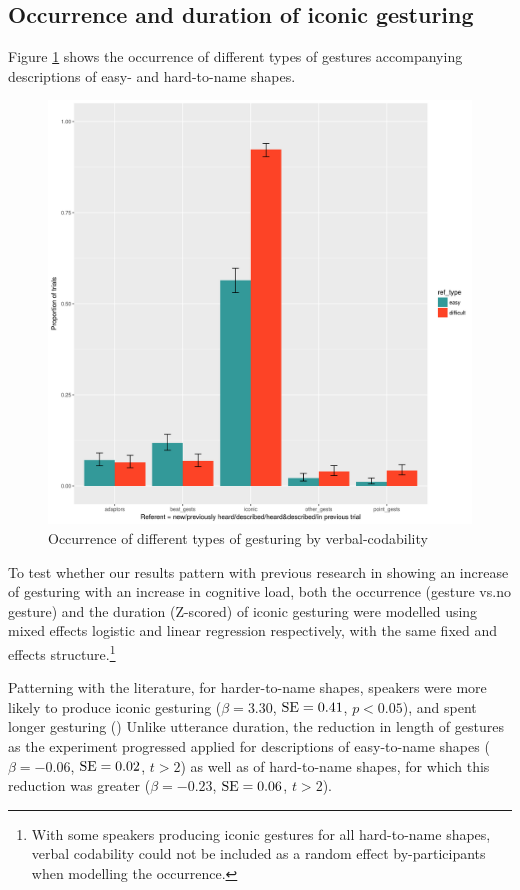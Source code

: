 \documentclass[a4paper,man,natbib]{apa6}
\newcommand{\resultsLog}[3]{$\beta = #1$, $\textnormal{SE} = #2$, $p #3$}
\newcommand{\resultsLM}[3]{$\beta = #1$, $\textnormal{SE} = #2$, $t #3$}
\begin{document}
\subsection{Occurrence and duration of iconic gesturing}
Figure \ref{fig:gtypes} shows the occurrence of different types of gestures accompanying descriptions of easy- and hard-to-name shapes.
\begin{figure}
  \centering
	\includegraphics[width=\linewidth]{e5_gest_occurrence.png}
  \caption{Occurrence of different types of gesturing by verbal-codability}
  \label{fig:gtypes}
\end{figure}
To test whether our results pattern with previous research in showing an increase of gesturing with an increase in cognitive load, both the occurrence (gesture vs.\@ no gesture) and the duration (Z-scored) of iconic gesturing were modelled using mixed effects logistic and linear regression respectively, with the same fixed and effects structure.\footnote{With some speakers producing iconic gestures for all hard-to-name shapes, verbal codability could not be included as a random effect by-participants when modelling the occurrence.}

Patterning with the literature, for harder-to-name shapes, speakers were more likely to produce iconic gesturing (\resultsLog{3.30}{0.41}{<0.05}), and spent longer gesturing ()
Unlike utterance duration, the reduction in length of gestures as the experiment progressed applied for descriptions of easy-to-name shapes (\resultsLM{-0.06}{0.02}{>2}) as well as of hard-to-name shapes, for which this reduction was greater (\resultsLM{-0.23}{0.06}{>2}).
\end{document}
